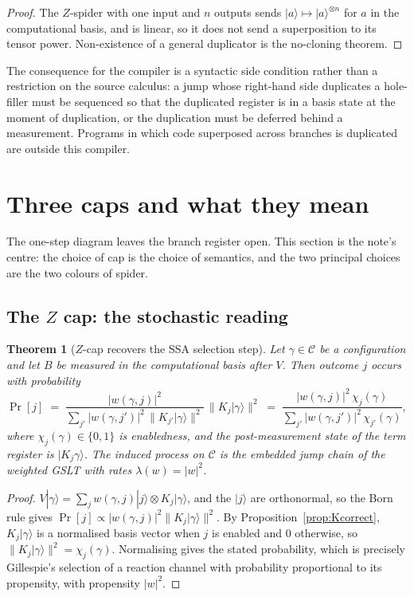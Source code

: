 \documentclass[11pt]{article}
\theoremstyle{definition}
\theoremstyle{plain}
\newtheorem{theorem}[definition]{Theorem}
\newcommand{\Cfg}{\mathcal{C}}
\newcommand{\ket}[1]{| #1 \rangle}
\begin{document}
\begin{proof}
The $Z$-spider with one input and $n$ outputs sends $\ket{a}\mapsto\ket{a}^{\otimes n}$ for
$a$ in the computational basis, and is linear, so it does not send a superposition to its
tensor power. Non-existence of a general duplicator is the no-cloning theorem.
\end{proof}

The consequence for the compiler is a syntactic side condition rather than a restriction on the
source calculus: a jump whose right-hand side duplicates a hole-filler must be sequenced so that
the duplicated register is in a basis state at the moment of duplication, or the duplication must
be deferred behind a measurement. Programs in which code superposed across branches is duplicated
are outside this compiler.

\section{Three caps and what they mean}\label{sec:caps}

The one-step diagram leaves the branch register open. This section is the note's centre: the
choice of cap is the choice of semantics, and the two principal choices are the two colours of
spider.

\subsection{The \texorpdfstring{$Z$}{Z} cap: the stochastic reading}

\begin{theorem}[$Z$-cap recovers the SSA selection step]\label{thm:classical}
Let $\gamma\in\Cfg$ be a configuration and let $B$ be measured in the computational basis after
$V$. Then outcome $j$ occurs with probability
\[
  \Pr[j] \;=\; \frac{|w(\gamma,j)|^2}{\sum_{j'} |w(\gamma,j')|^2\,\|K_{j'}\ket{\gamma}\|^2}\,
  \|K_j\ket{\gamma}\|^2
  \;=\; \frac{|w(\gamma,j)|^2\,\chi_j(\gamma)}{\sum_{j'} |w(\gamma,j')|^2\,\chi_{j'}(\gamma)},
\]
where $\chi_j(\gamma)\in\{0,1\}$ is enabledness, and the post-measurement state of the term
register is $\ket{K_j\gamma}$. The induced process on $\Cfg$ is the embedded jump chain of the
weighted GSLT with rates $\lambda(w) = |w|^2$.
\end{theorem}

\begin{proof}
$V\ket{\gamma} = \sum_j w(\gamma,j)\ket{j}\otimes K_j\ket{\gamma}$, and the $\ket{j}$ are
orthonormal, so the Born rule gives
$\Pr[j] \propto |w(\gamma,j)|^2\|K_j\ket{\gamma}\|^2$. By
Proposition~\ref{prop:Kcorrect}, $K_j\ket{\gamma}$ is a normalised basis vector when $j$ is
enabled and $0$ otherwise, so $\|K_j\ket{\gamma}\|^2 = \chi_j(\gamma)$. Normalising gives the
stated probability, which is precisely Gillespie's selection of a reaction channel with
probability proportional to its propensity, with propensity $|w|^2$.
\end{proof}
\end{document}
